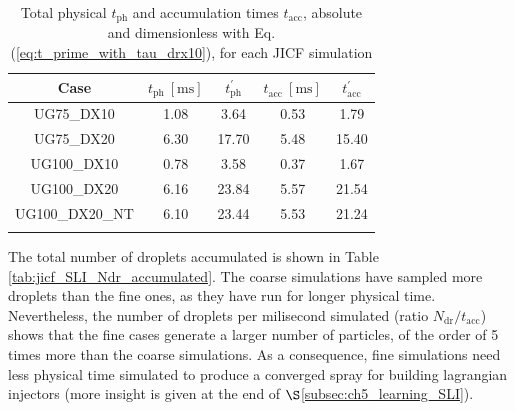 \begin{table}[!h]
\centering
\caption{Total physical $t_\mathrm{ph}$ and accumulation times $t_\mathrm{acc}$, absolute and dimensionless with Eq. (\ref{eq:t_prime_with_tau_drx10}), for each JICF simulation}
\begin{tabular}{ccccc}
\thickhline
\textbf{Case} & $t_\mathrm{ph}~[\mathrm{ms}]$ &  $t_\mathrm{ph}^{\prime}$ & $t_\mathrm{acc}~[\mathrm{ms}]$  & $t_\mathrm{acc}^{\prime}$  \\
\hline
UG75\_DX10 & 1.08 & 3.64 & 0.53 & 1.79 \\
UG75\_DX20 & 6.30 & 17.70 & 5.48  & 15.40 \\
UG100\_DX10 & 0.78  & 3.58 & 0.37 & 1.67 \\
UG100\_DX20  & 6.16 & 23.84 & 5.57 & 21.54 \\
UG100\_DX20\_NT  & 6.10  & 23.44 & 5.53 &  21.24 \\
\thickhline
\end{tabular}
\label{tab:jicf_SLI_t_prime_accumulation}
\end{table}


The total number of droplets accumulated is shown in Table \ref{tab:jicf_SLI_Ndr_accumulated}. The coarse simulations have sampled more droplets than the fine ones, as they have run for longer physical time. Nevertheless, the number of droplets per milisecond simulated (ratio $N_\mathrm{dr}/t_\mathrm{acc}$) shows that the fine cases generate a larger number of particles, of the order of 5 times more than the coarse simulations. As a consequence, fine simulations need less physical time simulated to produce a converged spray for building lagrangian injectors (more insight is given at the end of $\S$\ref{subsec:ch5_learning_SLI}).



